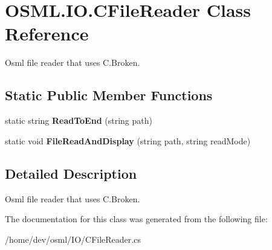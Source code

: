 \hypertarget{classOSML_1_1IO_1_1CFileReader}{}\section{O\+S\+M\+L.\+I\+O.\+C\+File\+Reader Class Reference}
\label{classOSML_1_1IO_1_1CFileReader}


Osml file reader that uses C.\+Broken.  


\subsection*{Static Public Member Functions}
\begin{DoxyCompactItemize}
\item 
\mbox{\label{classOSML_1_1IO_1_1CFileReader_a1598145575b1e0a13fdd3c513d102d74}} 
static string {\bfseries Read\+To\+End} (string path)
\item 
\mbox{\label{classOSML_1_1IO_1_1CFileReader_ab51b2a8b90cceb60eee81fc6608dbbb1}} 
static void {\bfseries File\+Read\+And\+Display} (string path, string read\+Mode)
\end{DoxyCompactItemize}


\subsection{Detailed Description}
Osml file reader that uses C.\+Broken. 



The documentation for this class was generated from the following file\+:\begin{DoxyCompactItemize}
\item 
/home/dev/osml/\+I\+O/C\+File\+Reader.\+cs\end{DoxyCompactItemize}
